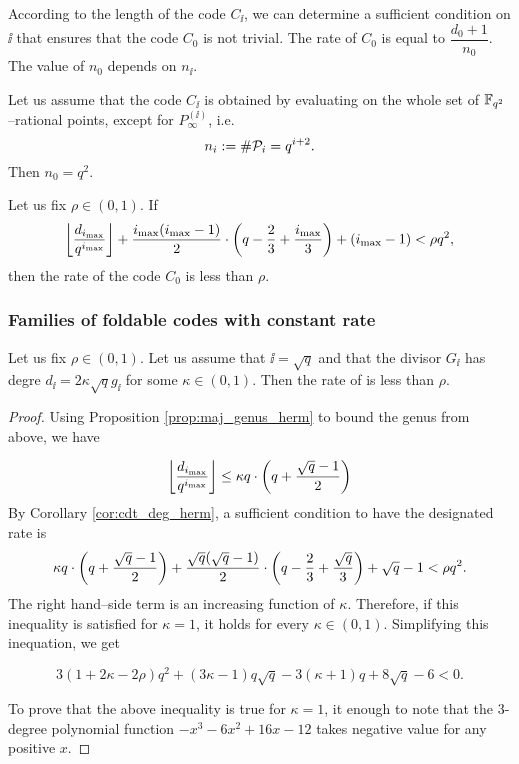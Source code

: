 \documentclass[10pt]{article}
\begin{document}
According to the length of the code $C_{\ii}$, we can determine a sufficient condition on $\ii$ that ensures that the code $C_0$ is not trivial. The rate of $C_0$ is equal to $\dfrac{d_0+1}{n_0}$. The value of $n_0$ depends on $n_{\ii}$.

Let us assume that the code $C_{\ii}$ is obtained by evaluating on the whole set of $\mathbb{F}_{q^2}$--rational points, except for $P_\infty^{(\ii)}$, i.e. 
\[n_i := \#\mathcal{P}_i = q^{i+2}.\]
Then $n_0=q^2$. 

\begin{corollary}\label{cor:cdt_deg_herm}
Let us fix $\rho \in (0,1)$. If
\[ \left\lfloor \dfrac{d_{i_{\rm{max}}}}{q^{i_{\rm{max}}}}\right\rfloor + \dfrac{i_{\rm{max}}(i_{\rm{max}}-1)}{2}\cdot \left(q-\frac{2}{3} + \frac{i_{\rm{max}}}{3}\right) + (i_{\rm{max}}-1) < \rho q^2,\]
then the rate of the code $C_0$ is less than $\rho$.
\end{corollary}

\subsubsection{Families of foldable codes with constant rate}


\begin{proposition}
	Let us fix $\rho \in (0,1)$. Let us assume that $\ii =\sqrt{q}$ and that the divisor $G_{\ii}$ has degre $d_{\ii} = 2\kappa \sqrt{q}g_{\ii}$ for some $\kappa \in (0,1)$.
	Then the rate of  is less than $\rho$.
\end{proposition}
\begin{proof}
	Using Proposition \ref{prop:maj_genus_herm} to bound the genus from above, we have
	
	\[ \left\lfloor\dfrac{d_{i_{\rm{max}}}}{q^{i_{\rm{max}}}}\right\rfloor \leq  \kappa q \cdot \left( q + \dfrac{\sqrt{q}-1}{2} \right)\]
	By Corollary \ref{cor:cdt_deg_herm}, a sufficient condition to have the designated rate is 
	\[\kappa q\cdot \left( q + \dfrac{\sqrt{q}-1}{2} \right)+\dfrac{\sqrt{q}(\sqrt{q}-1)}{2}\cdot \left(q-\frac{2}{3} + \frac{\sqrt{q}}{3}\right) + \sqrt{q}-1 < \rho q^2.\]
	The right hand--side term is an increasing function of $\kappa$. Therefore, if this inequality is satisfied for $\kappa=1$, it holds for every $\kappa \in (0,1)$. Simplifying this inequation, we get
		 
	
	\[3(1+2\kappa - 2\rho) q^2 + (3\kappa-1)q\sqrt{q}-3(\kappa+1)q+8\sqrt{q}-6 <0.\]
	
	
	To prove that the above inequality is true for $\kappa=1$, it enough to note that the 3-degree polynomial function $-x^3-6x^2+16x-12$ takes negative value for any positive $x$.
\end{proof}
\end{document}
